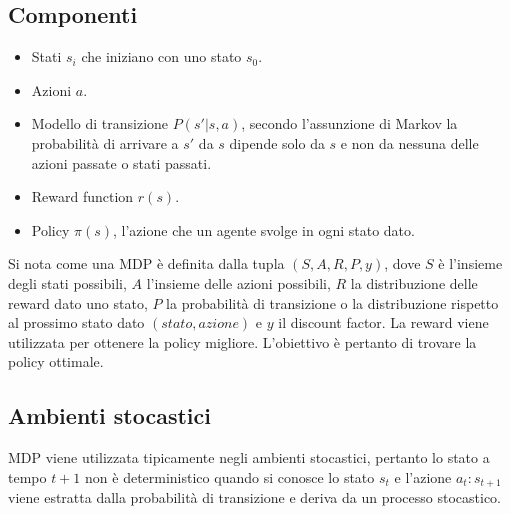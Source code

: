 	\subsection{Componenti}
	\begin{itemize}
		\item Stati $s_i$ che iniziano con uno stato $s_0$.
		\item Azioni $a$.
		\item Modello di transizione $P(s'|s,a)$, secondo l'assunzione di Markov la probabilit\`a di arrivare a $s'$ da $s$ dipende solo da $s$ e non da nessuna delle azioni passate o stati passati.
		\item Reward function $r(s)$.
		\item Policy $\pi(s)$, l'azione che un agente svolge in ogni stato dato.
	\end{itemize}
	Si nota come una MDP \`e definita dalla tupla $(S, A, R, P, y)$, dove $S$ \`e l'insieme degli stati possibili, $A$ l'insieme delle azioni possibili, $R$ la distribuzione delle reward dato uno stato, $P$ la probabilit\`a di transizione o la distribuzione rispetto al prossimo stato dato $(stato, azione)$ e $y$ il discount factor.
	La reward viene utilizzata per ottenere la policy migliore.
	L'obiettivo \`e pertanto di trovare la policy ottimale.
	
	\subsection{Ambienti stocastici}
	MDP viene utilizzata tipicamente negli ambienti stocastici, pertanto lo stato a tempo $t+1$ non \`e deterministico quando si conosce lo stato $s_t$ e l'azione $a_t:s_{t+1}$ viene estratta dalla probabilit\`a di transizione e deriva da un processo stocastico.
	
